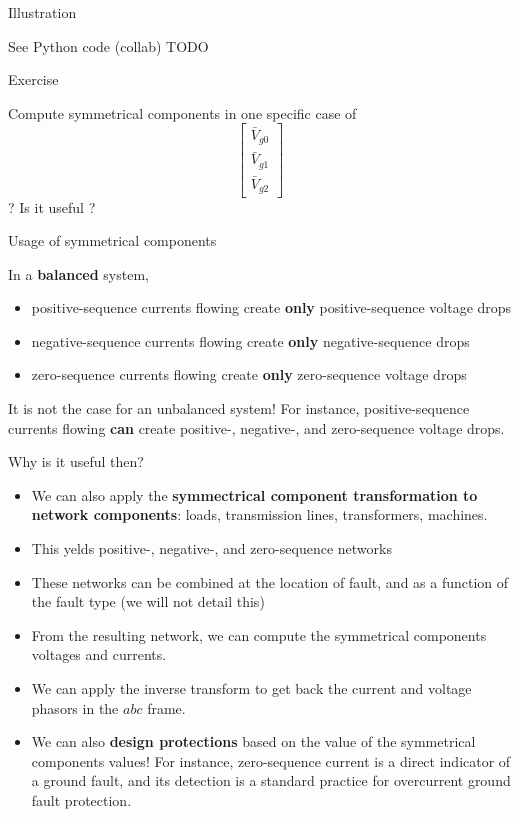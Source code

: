 \begin{frame}{Illustration}

See Python code (collab) TODO    

\end{frame}

\begin{frame}{Exercise}

Compute symmetrical components in one specific case of $$\left[\begin{array}{l}\bar{V}_{g0} \\ \bar{V}_{g1} \\ \bar{V}_{g2}\end{array}\right]$$ ?
Is it useful ? 

\end{frame}


\begin{frame}[allowframebreaks]{Usage of symmetrical components}

In a \textbf{balanced} system, 
\begin{itemize}
    \item \alert{positive-sequence} currents flowing create \textbf{only} \alert{positive-sequence} voltage drops 
    \item \alert{negative-sequence} currents flowing create \textbf{only} \alert{negative-sequence} drops 
    \item \alert{zero-sequence} currents flowing create \textbf{only} \alert{zero-sequence} voltage drops 
\end{itemize}

It is not the case for an unbalanced system!  For instance, positive-sequence currents flowing \textbf{can} create positive-, negative-, and zero-sequence voltage drops. 
    
Why is it useful then? 

\begin{itemize}
    \item We can also apply the \textbf{symmectrical component transformation to network components}: loads, transmission lines, transformers, machines. 
    \item This yelds positive-, negative-, and zero-sequence networks
    \item These networks can be combined at the location of fault, and as a function of the fault type (we will not detail this)
    \item From the resulting network, we can compute the symmetrical components voltages and currents. 
    \item We can apply the inverse transform to get back the current and voltage phasors in the $abc$ frame.
    \item We can also \textbf{design protections} based on the value of the symmetrical components values! For instance, zero-sequence current is a direct indicator of a ground fault, and its detection is a standard practice for overcurrent ground fault protection.
\end{itemize}
\end{frame}

